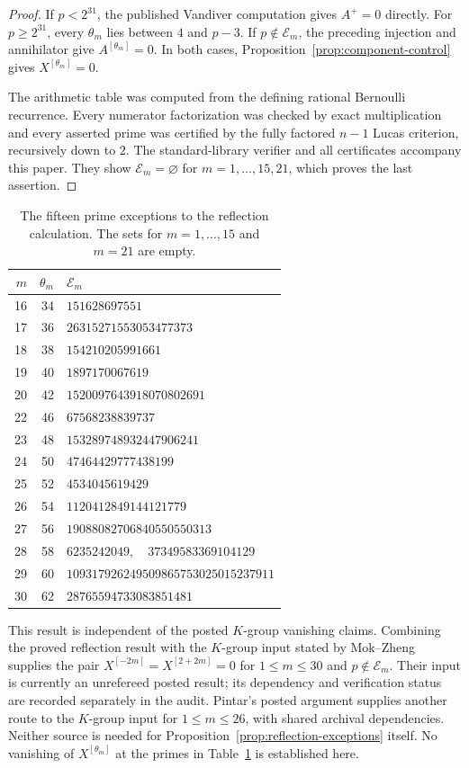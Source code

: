 \documentclass[11pt]{article}
\theoremstyle{definition}\newtheorem{definition}[theorem]{Definition}
\begin{document}
\begin{proof}
If $p<2^{31}$, the published Vandiver computation
\cite[\S1, assertion~(2)]{HHO} gives $A^+=0$ directly.
For $p\geq2^{31}$, every $\theta_m$ lies between $4$ and $p-3$.
If $p\notin\mathcal E_m$, the preceding injection and annihilator
give $A^{[\theta_m]}=0$. In both cases,
Proposition~\ref{prop:component-control} gives $X^{[\theta_m]}=0$.

The arithmetic table was computed from the defining rational
Bernoulli recurrence. Every numerator factorization was checked
by exact multiplication and every asserted prime was certified
by the fully factored $n-1$ Lucas criterion, recursively down to $2$.
The standard-library verifier and all certificates accompany this paper.
They show $\mathcal E_m=\varnothing$ for $m=1,\ldots,15,21$,
which proves the last assertion.
\end{proof}

\begin{table}[htbp]
\centering
\small
\begin{tabular}{rrl}
$m$ & $\theta_m$ & $\mathcal E_m$ \\
\hline
16&34&$151628697551$\\
17&36&$26315271553053477373$\\
18&38&$154210205991661$\\
19&40&$1897170067619$\\
20&42&$1520097643918070802691$\\
22&46&$67568238839737$\\
23&48&$153289748932447906241$\\
24&50&$47464429777438199$\\
25&52&$4534045619429$\\
26&54&$1120412849144121779$\\
27&56&$19088082706840550550313$\\
28&58&$6235242049,\quad37349583369104129$\\
29&60&$109317926249509865753025015237911$\\
30&62&$28765594733083851481$\\
\hline
\end{tabular}
\caption{The fifteen prime exceptions to the reflection calculation.
The sets for $m=1,\ldots,15$ and $m=21$ are empty.}
\label{tab:reflection-exceptions}
\end{table}

This result is independent of the posted $K$-group vanishing claims.
Combining the proved reflection result with the $K$-group input stated
by Mok--Zheng supplies the pair
$X^{[-2m]}=X^{[2+2m]}=0$ for $1\leq m\leq30$ and
$p\notin\mathcal E_m$. Their input is currently an unrefereed
posted result; its dependency and verification status are recorded
separately in the audit. Pintar's posted argument supplies another
route to the $K$-group input for $1\leq m\leq26$, with shared
archival dependencies. Neither source is needed for
Proposition~\ref{prop:reflection-exceptions} itself.
No vanishing of $X^{[\theta_m]}$ at the primes in
Table~\ref{tab:reflection-exceptions} is established here.
\end{document}
